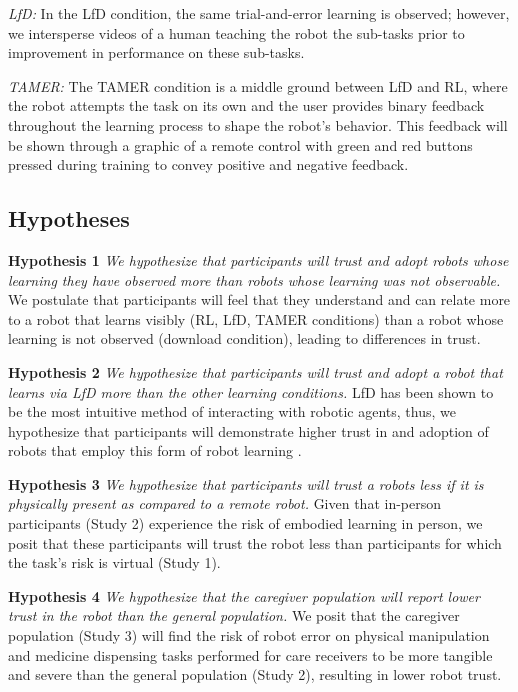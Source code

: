 \documentclass[letterpaper]{article} %
\begin{document}
\textit{LfD: }In the LfD condition, the same trial-and-error learning is observed; however, we intersperse videos of a human teaching the robot the sub-tasks prior to improvement in performance on these sub-tasks.

\textit{TAMER: }The TAMER condition is a middle ground between LfD and RL, where the robot attempts the task on its own and the user provides binary feedback throughout the learning process to shape the robot's behavior. This feedback will be shown through a graphic of a remote control with green and red buttons pressed during training to convey positive and negative feedback.

\subsection{Hypotheses}
\label{sec:hypotheses}

\textbf{Hypothesis 1} \textit{We hypothesize that participants will trust and adopt robots whose learning they have observed more than robots whose learning was not observable.} We postulate that participants will feel that they understand and can relate more to a robot that learns visibly (RL, LfD, TAMER conditions) than a robot whose learning is not observed (download condition), leading to differences in trust.

\textbf{Hypothesis 2} \textit{We hypothesize that participants will trust and adopt a robot that learns via LfD more than the other learning conditions.} LfD has been shown to be the most intuitive method of interacting with robotic agents, thus, we hypothesize that participants will demonstrate higher trust in and adoption of robots that employ this form of robot learning \cite{7451754, Akgun2011RobotLF}.

\textbf{Hypothesis 3} \textit{We hypothesize that participants will trust a robots less if it is physically present as compared to a remote robot.} Given that in-person participants (Study 2) experience the risk of embodied learning in person, we posit that these participants will trust the robot less than participants for which the task's risk is virtual (Study 1).

\textbf{Hypothesis 4} \textit{We hypothesize that the caregiver population will report lower trust in the robot than the general population.} We posit that the caregiver population (Study 3) will find the risk of robot error on physical manipulation and medicine dispensing tasks performed for care receivers to be more tangible and severe than the general population (Study 2), resulting in lower robot trust.
\end{document}
